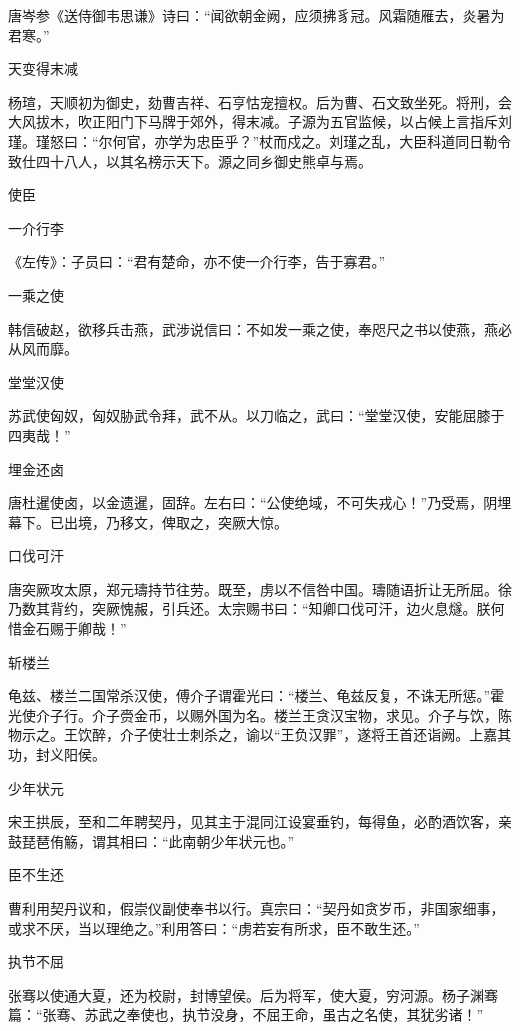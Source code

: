 \documentclass[a4paper,12pt,UTF8,twoside]{ctexbook}
\begin{document}
    唐岑参《送侍御韦思谦》诗曰：“闻欲朝金阙，应须拂豸冠。风霜随雁去，炎暑为君寒。”
    
    天变得末减
    
    杨瑄，天顺初为御史，劾曹吉祥、石亨怙宠擅权。后为曹、石文致坐死。将刑，会大风拔木，吹正阳门下马牌于郊外，得末减。子源为五官监候，以占候上言指斥刘瑾。瑾怒曰：“尔何官，亦学为忠臣乎？”杖而戍之。刘瑾之乱，大臣科道同日勒令致仕四十八人，以其名榜示天下。源之同乡御史熊卓与焉。
    
    使臣
    
    一介行李
    
    《左传》：子员曰：“君有楚命，亦不使一介行李，告于寡君。”
    
    一乘之使
    
    韩信破赵，欲移兵击燕，武涉说信曰：不如发一乘之使，奉咫尺之书以使燕，燕必从风而靡。
    
    堂堂汉使
    
    苏武使匈奴，匈奴胁武令拜，武不从。以刀临之，武曰：“堂堂汉使，安能屈膝于四夷哉！”
    
    埋金还卤
    
    唐杜暹使卤，以金遗暹，固辞。左右曰：“公使绝域，不可失戎心！”乃受焉，阴埋幕下。已出境，乃移文，俾取之，突厥大惊。
    
    口伐可汗
    
    唐突厥攻太原，郑元璹持节往劳。既至，虏以不信咎中国。璹随语折让无所屈。徐乃数其背约，突厥愧赧，引兵还。太宗赐书曰：“知卿口伐可汗，边火息燧。朕何惜金石赐于卿哉！”
    
    斩楼兰
    
    龟兹、楼兰二国常杀汉使，傅介子谓霍光曰：“楼兰、龟兹反复，不诛无所惩。”霍光使介子行。介子赍金币，以赐外国为名。楼兰王贪汉宝物，求见。介子与饮，陈物示之。王饮醉，介子使壮士刺杀之，谕以“王负汉罪”，遂将王首还诣阙。上嘉其功，封义阳侯。
    
    少年状元
    
    宋王拱辰，至和二年聘契丹，见其主于混同江设宴垂钓，每得鱼，必酌酒饮客，亲鼓琵琶侑觞，谓其相曰：“此南朝少年状元也。”
    
    臣不生还
    
    曹利用契丹议和，假崇仪副使奉书以行。真宗曰：“契丹如贪岁币，非国家细事，或求不厌，当以理绝之。”利用答曰：“虏若妄有所求，臣不敢生还。”
    
    执节不屈
    
    张骞以使通大夏，还为校尉，封博望侯。后为将军，使大夏，穷河源。杨子渊骞篇：“张骞、苏武之奉使也，执节没身，不屈王命，虽古之名使，其犹劣诸！”
    
\end{document}
